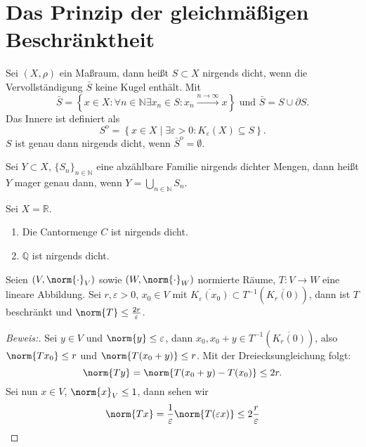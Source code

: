 \section{Das Prinzip der gleichmäßigen Beschränktheit}
\begin{definition}
	Sei $(X, \rho)$ ein Maßraum, dann heißt $S \subset X$ nirgends dicht, wenn die Vervollständigung $\bar{S}$ keine Kugel enthält. Mit 
	\[
	\bar{S} = \left\{ x \in X : \forall n \in \mathbb{N} \exists x_n \in S: x_n \xrightarrow{n \to \infty} x \right\} \text{ und } \bar{S} = S \cup \partial S.
	\] 
	Das Innere ist definiert als 
	\[
	S^{\mathrm{o}} = \left\{ x \in X \mid \exists \varepsilon > 0: K_{\varepsilon}(X) \subseteq S \right\}.
	\] 
	$S$ ist genau dann nirgends dicht, wenn $\bar{S}^{\mathrm{o}} = \emptyset$.
\end{definition}

\begin{definition}
	Sei $Y \subset X$, $\{S_n\}_{n \in \mathbb{N}}$ eine abzählbare Familie nirgends dichter Mengen, dann heißt $Y$ mager genau dann, wenn $Y = \bigcup_{n \in \mathbb{N}} S_n$.
\end{definition}

\begin{ex}
	Sei $X = \mathbb{R}$. 
	\begin{enumerate}
		\item Die Cantormenge $C$ ist nirgends dicht.
		\item $\mathbb{Q}$ ist nirgends dicht.
	\end{enumerate}
\end{ex}

\begin{lemma} \label{lemma_glm_beschr}
	Seien $(V, \norm{\cdot}_V)$ sowie $(W, \norm{\cdot}_W)$ normierte Räume, $T: V \to W$ eine lineare Abbildung. Sei $r, \varepsilon > 0$, $x_0 \in V$ mit $\overline{K_{\varepsilon}(x_0)} \subset T^{-1}(\overline{K_r(0)})$, dann ist $T$ beschränkt und $\norm{T} \leq \frac{2r}{\varepsilon}$.
	
	\begin{proof}[Beweis:] 
		Sei $y \in V$ und $\norm{y} \leq \varepsilon$, dann $x_0, x_0 + y \in T^{-1}(\overline{K_r(0)})$, also $\norm{Tx_0} \leq r$ und $\norm{T(x_0 + y)} \leq r$. Mit der Dreiecksungleichung folgt: 
		\[
		\norm{Ty} = \norm{T(x_0 + y) - T(x_0)} \leq 2r.
		\] 
		Sei nun $x \in V$, $\norm{x}_V \leq 1$, dann sehen wir 
		\[
		\norm{Tx} = \frac{1}{\varepsilon} \norm{T(\varepsilon x)} \leq 2 \frac{r}{\varepsilon}
		\]
	\end{proof}
\end{lemma}


